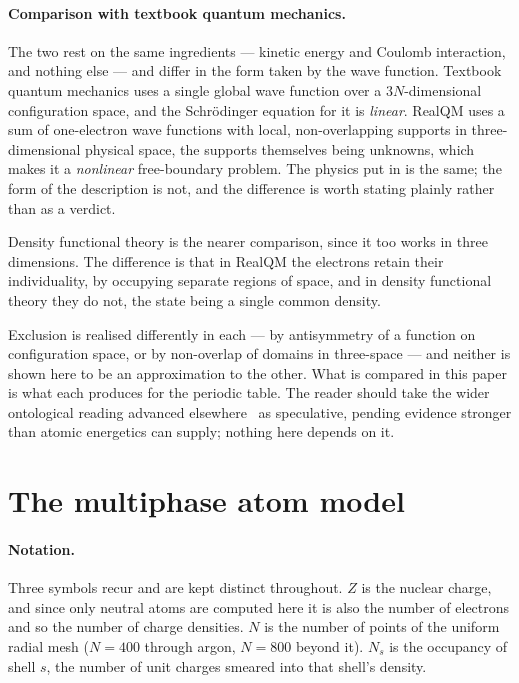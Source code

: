 \documentclass[11pt]{article}
\begin{document}
\paragraph{Comparison with textbook quantum mechanics.} The two rest on the same ingredients
--- kinetic energy and Coulomb interaction, and nothing else --- and differ in the form taken by
the wave function. Textbook quantum mechanics uses a single global wave function over a
$3N$-dimensional configuration space, and the Schr\"odinger equation for it is \emph{linear}.
RealQM uses a sum of one-electron wave functions with local, non-overlapping supports in
three-dimensional physical space, the supports themselves being unknowns, which makes it a
\emph{nonlinear} free-boundary problem. The physics put in is the same; the form of the
description is not, and the difference is worth stating plainly rather than as a verdict.

Density functional theory is the nearer comparison, since it too works in three dimensions. The
difference is that in RealQM the electrons retain their individuality, by occupying separate
regions of space, and in density functional theory they do not, the state being a single common
density.

Exclusion is realised differently in each --- by
antisymmetry of a function on configuration space, or by non-overlap of domains in
three-space --- and neither is shown here to be an approximation to the other. What is
compared in this paper is what each produces for the periodic table. The reader should take
the wider ontological reading advanced elsewhere~\cite{Johnson-RealQM} as speculative,
pending evidence stronger than atomic energetics can supply; nothing here depends on it.

\section{The multiphase atom model}\label{sec:model}

\paragraph{Notation.} Three symbols recur and are kept distinct throughout. $Z$ is the nuclear
charge, and since only neutral atoms are computed here it is also the number of electrons and so the
number of charge densities. $N$ is the number of points of the uniform radial mesh ($N=400$ through
argon, $N=800$ beyond it). $N_s$ is the occupancy of shell $s$, the number of unit charges smeared
into that shell's density.
\end{document}
